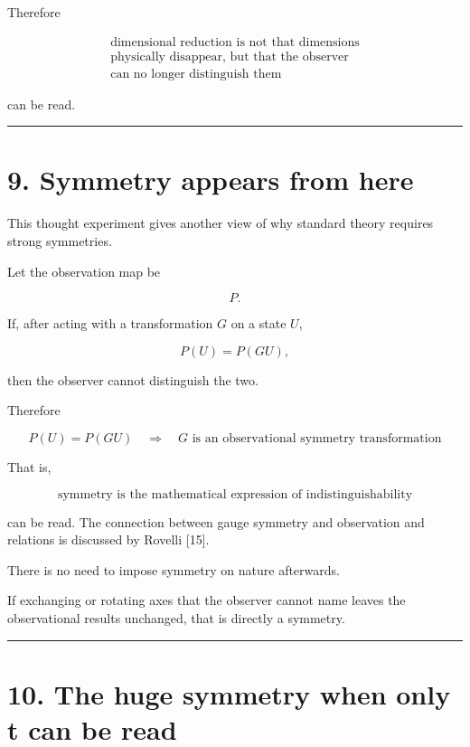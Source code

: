 \documentclass[
  a4paper,
]{article}
\begin{document}
Therefore

\[
\boxed{
\begin{array}{c}
\text{dimensional reduction is not that dimensions}\\
\text{physically disappear, but that the observer}\\
\text{can no longer distinguish them}
\end{array}
}
\]

can be read.

\begin{center}\rule{0.5\linewidth}{0.5pt}\end{center}

\section{9. Symmetry appears from
here}\label{symmetry-appears-from-here}

This thought experiment gives another view of why standard theory
requires strong symmetries.

Let the observation map be

\[
P .
\]

If, after acting with a transformation \(G\) on a state \(U\),

\[
P(U)=P(GU),
\]

then the observer cannot distinguish the two.

Therefore

\[
\boxed{
P(U)=P(GU)
\quad\Longrightarrow\quad
G\text{ is an observational symmetry transformation}
}
\]

That is,

\[
\boxed{
\text{symmetry is the mathematical expression of indistinguishability}
}
\]

can be read. The connection between gauge symmetry and observation and
relations is discussed by Rovelli {[}15{]}.

There is no need to impose symmetry on nature afterwards.

If exchanging or rotating axes that the observer cannot name leaves the
observational results unchanged, that is directly a symmetry.

\begin{center}\rule{0.5\linewidth}{0.5pt}\end{center}

\section{10. The huge symmetry when only t can be
read}\label{the-huge-symmetry-when-only-t-can-be-read}
\end{document}
